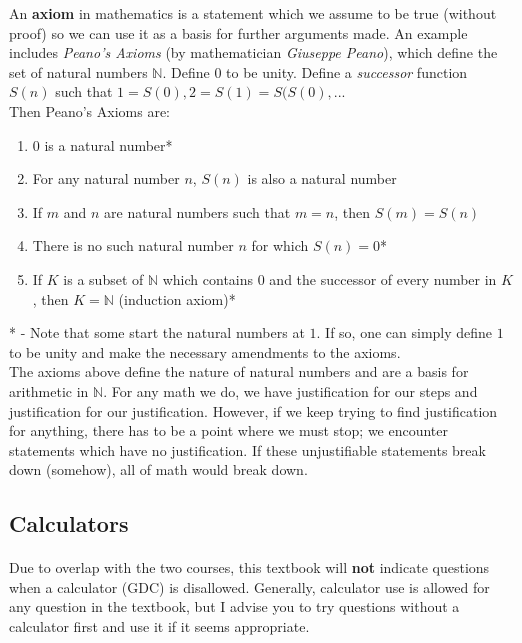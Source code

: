 \documentclass[12pt, a4paper, titlepage, twoside]{article}
\newcommand*{\N}{\mathbb{N}}
\begin{document}
	
	\begin{fr}
		\label{fr:peano}
		An \textbf{axiom} in mathematics is a statement which we assume to be true (without proof) so we can use it as a basis for further
		arguments made. An example includes \textit{Peano's Axioms} (by mathematician \textit{Giuseppe Peano}), which define 
		the set of natural numbers $\N$. Define $0$ to be unity. Define a \textit{successor} function $S(n)$ such that $1 = S(0), 
		2 = S(1) = S(S(0), ..$.\\
		
		Then Peano's Axioms are:
		
		\begin{enumerate}
			\item $0$ is a natural number*
			\item For any natural number $n$, $S(n)$ is also a natural number
			\item If $m$ and $n$ are natural numbers such that $m=n$, then $S(m) = S(n)$
			\item There is no such natural number $n$ for which $S(n) = 0$*
			\item If $K$ is a subset of $\N$ which contains $0$ and the successor of every number in $K$, then
			$K=\N$ (induction axiom)*
		\end{enumerate}
		
		* - Note that some start the natural numbers at $1$. If so, one can simply define $1$ to be unity and make the
		necessary amendments to the axioms.\\
		
		The axioms above define the nature of natural numbers and are a basis for arithmetic in $\N$. For any math
		we do, we have justification for our steps and justification for our justification. However, if we keep trying to
		find justification for anything, there has to be a point where we must stop; we encounter statements which have
		no justification. If these unjustifiable statements break down (somehow), all of math would break down.
	\end{fr}
	
	\subsection*{Calculators}
	
	\paragraph{}
	Due to overlap with the two courses, this textbook will \textbf{not} indicate questions when a calculator (GDC) is disallowed.
	Generally, calculator use is allowed for any question in the textbook, but I advise you to try questions without a calculator first and use 
	it if it seems appropriate.
	
\end{document}
